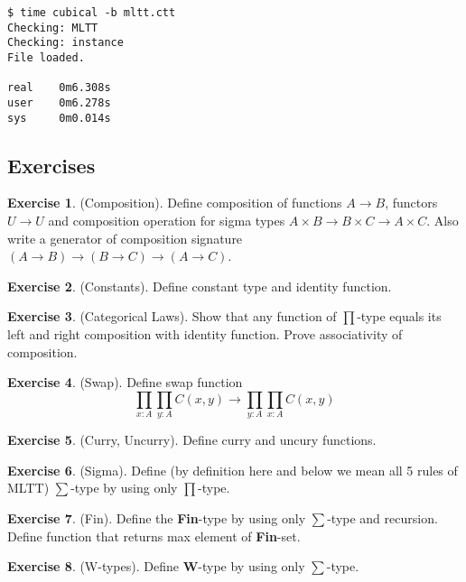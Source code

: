 \documentclass{article}
\theoremstyle{definition}
\newtheorem{exercise}{Exercise}
\begin{document}
\begin{lstlisting}
$ time cubical -b mltt.ctt
Checking: MLTT
Checking: instance
File loaded.

real    0m6.308s
user    0m6.278s
sys     0m0.014s
\end{lstlisting}

\subsection{Exercises}

\begin{exercise} (Composition). Define composition of functions $A \rightarrow B$,
functors $U \rightarrow U$ and composition operation for sigma types
$A \times B \rightarrow B \times C \rightarrow A \times C$. Also write a generator
of composition signature $(A \rightarrow B) \rightarrow (B \rightarrow C) \rightarrow (A \rightarrow C)$.
\end{exercise}

\begin{exercise} (Constants). Define constant type and identity function.
\end{exercise}

\begin{exercise} (Categorical Laws).
Show that any function of $\prod$-type equals its left and right composition with identity function.
Prove associativity of composition.
\end{exercise}

\begin{exercise} (Swap). Define swap function
$$
    \prod_{x:A}\prod_{y:A}C(x,y) \rightarrow \prod_{y:A}\prod_{x:A}C(x,y)
$$
\end{exercise}

\begin{exercise} (Curry, Uncurry). Define curry and uncury functions.
\end{exercise}

\begin{exercise} (Sigma). Define (by definition here and below we mean all 5 rules of MLTT)
$\sum$-type by using only $\prod$-type.
\end{exercise}

\begin{exercise} (Fin). Define the {\bf Fin}-type by using only $\sum$-type and recursion.
Define function that returns max element of {\bf Fin}-set.
\end{exercise}

\begin{exercise} (W-types). Define 
{\bf W}-type by using only $\sum$-type.
\end{exercise}
\end{document}
